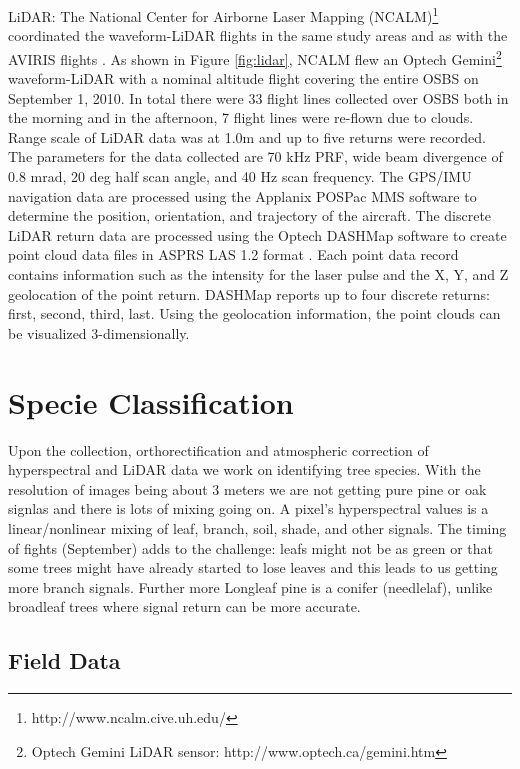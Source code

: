 \documentclass[remotesensing,article,accept,moreauthors,pdftex,12pt,a4paper]{mdpi}
\begin{document}
LiDAR: The National Center for Airborne Laser Mapping (NCALM)\footnote{http://www.ncalm.cive.uh.edu/} coordinated the waveform-LiDAR flights in the same study areas and as  with the AVIRIS flights \cite{neon2010aop}. As shown in Figure \ref{fig:lidar}, NCALM flew an Optech Gemini\footnote{Optech Gemini LiDAR sensor: http://www.optech.ca/gemini.htm} waveform-LiDAR with a nominal altitude flight covering the entire OSBS on September 1, 2010. In total there were 33 flight lines collected over OSBS both in the morning and in the afternoon, 7 flight lines were re-flown due to clouds. Range scale of LiDAR data was at 1.0m and up to five returns were recorded. The parameters for the data collected are 70 kHz PRF, wide beam divergence of 0.8 mrad, 20 deg half scan angle, and 40 Hz scan frequency. The GPS/IMU navigation data are processed using the Applanix POSPac MMS software to determine the position, orientation, and trajectory of the aircraft. The discrete LiDAR return data are processed using the Optech DASHMap software to create point cloud data files in ASPRS LAS 1.2 format \cite{las12format}. Each point data record contains information such as the intensity for the laser pulse and the X, Y, and Z geolocation of the point return. DASHMap reports up to four discrete returns: first, second, third, last. Using the geolocation information, the point clouds can be visualized 3-dimensionally.




\section{Specie Classification}

Upon the collection, orthorectification and atmospheric correction of hyperspectral and LiDAR data we work on identifying tree species. With the resolution of images being about 3 meters we are not getting pure pine or oak signlas and there is lots of mixing going on. A pixel's hyperspectral values is a linear/nonlinear mixing of leaf, branch, soil, shade, and other signals. The timing of fights (September) adds to the challenge: leafs might not be as green or that some trees might have already started to lose leaves and this leads to us getting more branch signals. Further more Longleaf pine is a conifer (needlelaf), unlike broadleaf trees where signal return can be more accurate. 

\subsection{Field Data}
\end{document}
